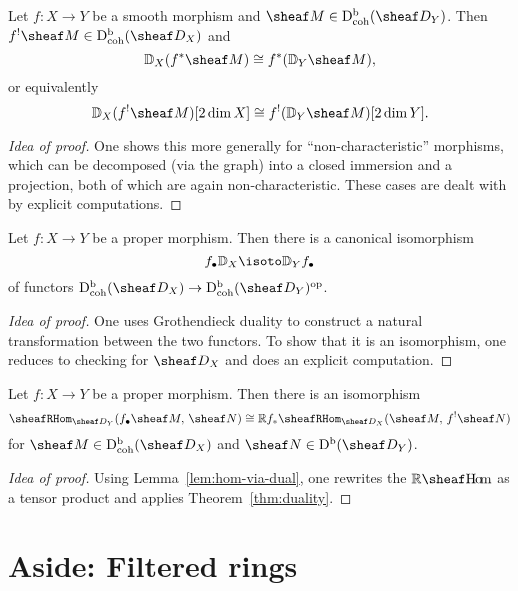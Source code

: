 \documentclass[number-in-sections,a4paper]{notes}
\begin{document}
\begin{Theorem}
    Let $f\colon X \to Y$ be a smooth morphism and $\sheaf M \in \catDbDModcoh{Y}$.
    Then $f^!\sheaf M \in \catDbDModcoh{X}$ and
    \[
        \DD_X(f^*\sheaf M) \cong f^*(\DD_Y \sheaf M),
    \]
    or equivalently
    \[
        \DD_X(f^!\sheaf M)[2\dim X] \cong f^!(\DD_Y \sheaf M)[2\dim Y].
    \]
\end{Theorem}

\begin{proof}[Idea of proof]
    One shows this more generally for \enquote{non-characteristic} morphisms, which can be decomposed (via the graph) into a closed immersion and a projection, both of which are again non-characteristic.
    These cases are dealt with by explicit computations.
\end{proof}

\begin{Theorem}\label{thm:duality}
    Let $f\colon X \to Y$ be a proper morphism.
    Then there is a canonical isomorphism
    \[
        f_\bullet \DD_X \isoto \DD_Y f_\bullet
    \]
    of functors $\catDbDModcoh{X} \to \oppcat{\catDbDModcoh{Y}}$.
\end{Theorem}

\begin{proof}[Idea of proof]
    One uses Grothendieck duality to construct a natural transformation between the two functors.
    To show that it is an isomorphism, one reduces to checking for $\sD_X$ and does an explicit computation.
\end{proof}

\begin{Theorem}\label{thm:proper-adjunction}
    Let $f\colon X \to Y$ be a proper morphism.
    Then there is an isomorphism
    \[
        \sheafRHom_{\sD_Y}(f_\bullet \sheaf M,\, \sheaf N) \cong \RR f_*\sheafRHom_{\sD_X}(\sheaf M,\, f^! \sheaf N)
    \]
    for $\sheaf M \in \catDbDModcoh{X}$ and $\sheaf N \in \catDbDMod{Y}$.
\end{Theorem}

\begin{proof}[Idea of proof]
    Using Lemma~\ref{lem:hom-via-dual}, one rewrites the $\RsheafHom$ as a tensor product and applies Theorem~\ref{thm:duality}.
\end{proof}

\section{Aside: Filtered rings}
\end{document}
